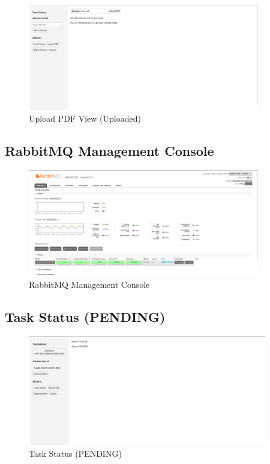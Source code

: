 \begin{figure}[H]
\centering
  \includegraphics[width=0.9\textwidth]{img/Interfaces/uploaded_pdf.png}
\caption{Upload PDF View (Uploaded)}
\label{Upload PDF View (Uploaded)}      
\end{figure}

\subsection{RabbitMQ Management Console}

\begin{figure}[H]
\centering
  \includegraphics[width=0.9\textwidth]{img/Interfaces/rabbitmq_ui.png}
\caption{RabbitMQ Management Console}
\label{RabbitMQ Management Console}      
\end{figure}


\subsection{Task Status (PENDING)}

\begin{figure}[H]
\centering
  \includegraphics[width=0.93\textwidth]{img/Interfaces/promise_pending.png}
\caption{Task Status (PENDING)}
\label{Task Status (PENDING)}      
\end{figure}

